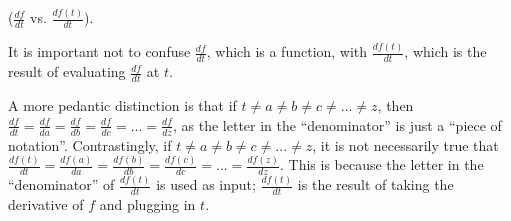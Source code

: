 \begin{remark}
    ($\frac{df}{dt}$ vs. $\frac{df(t)}{dt}$).
    
    It is important not to confuse $\frac{df}{dt}$, which is a function, with $\frac{df(t)}{dt}$, which is the result of evaluating $\frac{df}{dt}$ at $t$.
    
    A more pedantic distinction is that if $t \neq a \neq b \neq c \neq ... \neq z$, then $\frac{df}{dt} = \frac{df}{da} = \frac{df}{db} = \frac{df}{dc} = ... = \frac{df}{dz}$, as the letter in the ``denominator'' is just a ``piece of notation''. Contrastingly, if $t \neq a \neq b \neq c \neq ... \neq z$, it is not necessarily true that $\frac{df(t)}{dt} = \frac{df(a)}{da} = \frac{df(b)}{db} = \frac{df(c)}{dc} = ... = \frac{df(z)}{dz}$. This is because the letter in the ``denominator'' of $\frac{df(t)}{dt}$ is used as input; $\frac{df(t)}{dt}$ is the result of taking the derivative of $f$ and plugging in $t$.
\end{remark}

